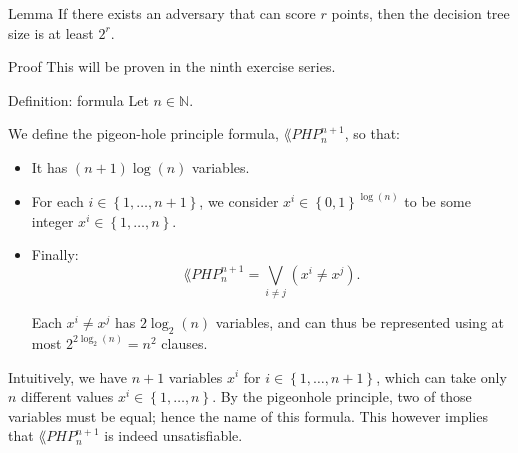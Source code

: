 \documentclass[a4paper]{article}
\begin{document}
\begin{parag}{Lemma}
    If there exists an adversary that can score $r$ points, then the decision tree size is at least $2^r$.

    \begin{subparag}{Proof}
        This will be proven in the ninth exercise series. 
    \end{subparag}
\end{parag}

\begin{parag}{Definition:  formula}
    Let $n \in \mathbb{N}$.

    We define the pigeon-hole principle formula, $\lang{PHP}_n^{n+1}$, so that:
    \begin{itemize}
        \item It has $\left(n+1\right)\log\left(n\right)$ variables.
        \item For each $i \in \left\{1, \ldots, n+1\right\}$, we consider $x^{i} \in \left\{0, 1\right\}^{\log\left(n\right)}$ to be some integer $x^i \in \left\{1, \ldots, n\right\}$. 
        \item Finally: 
        \[\lang{PHP}_n^{n+1} = \bigvee_{i \neq j} \left(x^{i} \neq x^{j}\right).\]
        
        Each $x^i \neq x^j$ has $2\log_2\left(n\right)$ variables, and can thus be represented using at most $2^{2 \log_2\left(n\right)} = n^2$ clauses.
    \end{itemize}

    Intuitively, we have $n+1$ variables $x^i$ for $i \in \left\{1, \ldots, n+1\right\}$, which can take only $n$ different values $x^i \in \left\{1, \ldots, n\right\}$. By the pigeonhole principle, two of those variables must be equal; hence the name of this formula. This however implies that $\lang{PHP}_n^{n+1}$ is indeed unsatisfiable.
\end{parag}
\end{document}
